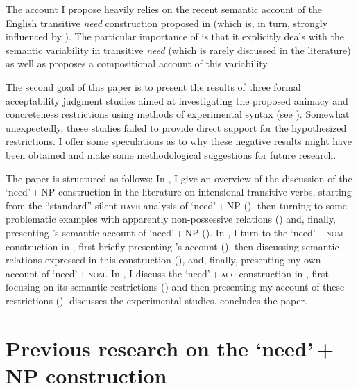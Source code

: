 \documentclass[output=paper]{langscibook}
\begin{document}
The account I propose heavily relies on the recent semantic account of the English transitive \textit{need} construction proposed in \citet{Zaroukian.Beller2013} (which is, in turn, strongly influenced by \citealt{Vikner.Jensen2002}). The particular importance of \citet{Zaroukian.Beller2013} is that it explicitly deals with the semantic variability in transitive \textit{need} (which is rarely discussed in the literature) as well as proposes a compositional account of this variability.

The second goal of this paper is to present the results of three formal acceptability judgment studies aimed at investigating the proposed animacy and concreteness restrictions using methods of experimental syntax (see \citealt{Sprouse.Hornstein2013}). Somewhat unexpectedly, these studies failed to provide direct support for the hypothesized restrictions. I offer some speculations as to why these negative results might have been obtained and make some methodological suggestions for future research.

The paper is structured as follows: In , I give an overview of the discussion of the `need'\,+\,NP construction in the literature on intensional transitive verbs, starting from the ``standard'' silent \textsc{have} analysis of `need'\,+\,NP (), then turning to some problematic examples with apparently non-possessive relations () and, finally, presenting \citeauthor{Zaroukian.Beller2013}'s \citeyearpar{Zaroukian.Beller2013} semantic account of `need'\,+\,NP (). In , I turn to the `need'\,+\,\textsc{nom} construction in , first briefly presenting \citeauthor{Harves2008}'s \citeyearpar{Harves2008} account (), then discussing semantic relations expressed in this construction (), and, finally, presenting my own account of `need'\,+\,\textsc{nom}. In , I discuss the `need'\,+\,\textsc{acc} construction in , first focusing on its semantic restrictions () and then presenting my account of these restrictions ().  discusses the experimental studies.  concludes the paper.

\section{Previous research on the `need'\,+\,NP construction\label{section-background}}
\end{document}
